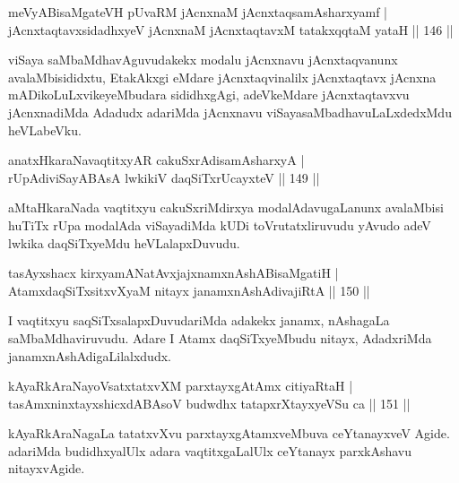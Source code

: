 
\begin{shl}
meVyABisaMgateVH pUvaRM jAcnxnaM jAcnxtaqsamAsharxyamf |\\
jAcnxtaqtavxsidadhxyeV jAcnxnaM jAcnxtaqtavxM tatakxqqtaM yataH \hfill || 146 ||
\end{shl}

\begin{artha}
viSaya saMbaMdhavAguvudakekx modalu jAcnxnavu jAcnxtaqvanunx avalaMbisididxtu, EtakAkxgi eMdare jAcnxtaqvinalilx jAcnxtaqtavx jAcnxna mADikoLuLxvikeyeMbudara sididhxgAgi, adeVkeMdare jAcnxtaqtavxvu jAcnxnadiMda Adadudx adariMda jAcnxnavu viSayasaMbadhavuLaLxdedxMdu heVLabeVku.
\end{artha}

\begin{shl}
anatxHkaraNavaqtitxyAR cakuSxrAdisamAsharxyA |\\
rUpAdiviSayABAsA lwkikiV daqSiTxrUcayxteV \hfill || 149 ||
\end{shl}

\begin{artha}
aMtaHkaraNada vaqtitxyu cakuSxriMdirxya modalAdavugaLanunx avalaMbisi huTiTx rUpa modalAda viSayadiMda kUDi toVrutatxliruvudu yAvudo adeV lwkika daqSiTxyeMdu heVLalapxDuvudu.
\end{artha}

\begin{shl}
tasAyxshacx kirxyamANatAvxjajxnamxnAshABisaMgatiH |\\
AtamxdaqSiTxsitxvXyaM nitayx janamxnAshAdivajiRtA \hfill || 150 ||
\end{shl}

\begin{artha}
I vaqtitxyu saqSiTxsalapxDuvudariMda adakekx janamx, nAshagaLa saMbaMdhaviruvudu. Adare I Atamx daqSiTxyeMbudu nitayx, AdadxriMda janamxnAshAdigaLilalxdudx.
\end{artha}

\begin{shl}
kAyaRkAraNayoVsatxtatxvXM parxtayxgAtAmx citiyaRtaH |\\
tasAmxninxtayxshicxdABAsoV budwdhx tatapxrXtayxyeVSu ca \hfill || 151 ||
\end{shl}

\begin{artha}
kAyaRkAraNagaLa tatatxvXvu parxtayxgAtamxveMbuva ceYtanayxveV Agide. adariMda budidhxyalUlx adara vaqtitxgaLalUlx ceYtanayx parxkAshavu nitayxvAgide.
\end{artha}

